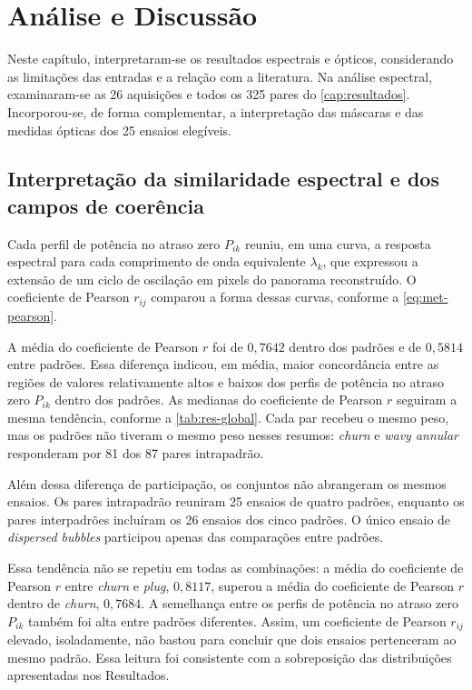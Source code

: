 \chapter{Análise e Discussão}\label{cap:discussao}

Neste capítulo, interpretaram-se os resultados espectrais e ópticos,
considerando as limitações das entradas e a relação com a literatura.
Na análise espectral, examinaram-se as 26 aquisições e todos os
325 pares do \autoref{cap:resultados}. Incorporou-se,
de forma complementar, a interpretação das máscaras e das medidas ópticas
dos 25 ensaios elegíveis.

\section{Interpretação da similaridade espectral e dos campos de coerência}\label{sec:disc-interpretacao}

Cada perfil de potência no atraso zero
$P_{ik}$ reuniu, em uma curva, a resposta espectral para cada comprimento
de onda equivalente $\lambda_k$, que expressou a extensão de um ciclo de
oscilação em pixels do panorama reconstruído. O coeficiente de Pearson
$r_{ij}$ comparou a forma dessas curvas, conforme a \autoref{eq:met-pearson}.

A média do coeficiente de Pearson $r$ foi de $0{,}7642$ dentro dos padrões
e de $0{,}5814$ entre padrões. Essa diferença indicou, em média, maior concordância
entre as regiões de valores relativamente altos e baixos dos perfis de
potência no atraso zero $P_{ik}$ dentro dos padrões.
As medianas do coeficiente de Pearson $r$
seguiram a mesma tendência, conforme a \autoref{tab:res-global}.
Cada par recebeu o mesmo peso, mas os padrões não tiveram o mesmo peso
nesses resumos: \textit{churn} e \textit{wavy annular} responderam por 81
dos 87 pares intrapadrão.

Além dessa diferença de participação, os conjuntos não abrangeram os
mesmos ensaios. Os pares intrapadrão reuniram 25 ensaios de quatro padrões,
enquanto os pares interpadrões incluíram os 26 ensaios dos cinco padrões.
O único ensaio de \textit{dispersed bubbles} participou apenas das comparações
entre padrões.

Essa tendência não se repetiu em todas as combinações:
a média do coeficiente de Pearson $r$ entre \textit{churn} e \textit{plug},
$0{,}8117$, superou a média do coeficiente de Pearson $r$ dentro de
\textit{churn}, $0{,}7684$. A semelhança entre os perfis de potência no
atraso zero $P_{ik}$ também foi alta entre padrões diferentes.
Assim, um coeficiente de Pearson $r_{ij}$ elevado, isoladamente, não
bastou para concluir que dois ensaios pertenceram ao mesmo padrão.
Essa leitura foi consistente com a sobreposição das distribuições
apresentadas nos Resultados.

